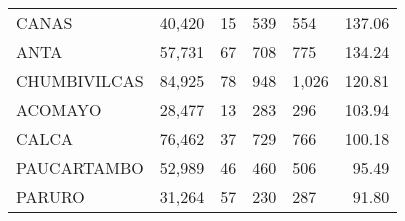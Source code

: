 \begin{tabular}{lrcclr}
	\cellcolor[HTML]{FFFF99}CANAS                                  & 40,420                                                         & 15                                                         & 539                  & 554                                                                 & 137.06                                                                       \\
	\cellcolor[HTML]{FFFF99}ANTA                                   & 57,731                                                         & 67                                                         & 708                  & 775                                                                 & 134.24                                                                       \\
	\cellcolor[HTML]{C6E0B4}CHUMBIVILCAS                           & 84,925                                                         & 78                                                         & 948                  & 1,026                                                               & 120.81                                                                       \\
	\cellcolor[HTML]{C6E0B4}ACOMAYO                                & 28,477                                                         & 13                                                         & 283                  & 296                                                                 & 103.94                                                                       \\
	\cellcolor[HTML]{C6E0B4}CALCA                                  & 76,462                                                         & 37                                                         & 729                  & 766                                                                 & 100.18                                                                       \\
	\cellcolor[HTML]{C6E0B4}PAUCARTAMBO                            & 52,989                                                         & 46                                                         & 460                  & 506                                                                 & 95.49                                                                        \\
	\cellcolor[HTML]{C6E0B4}PARURO                                 & 31,264                                                         & 57                                                         & 230                  & 287                                                                 & 91.80                                                                        \\

\end{tabular}
